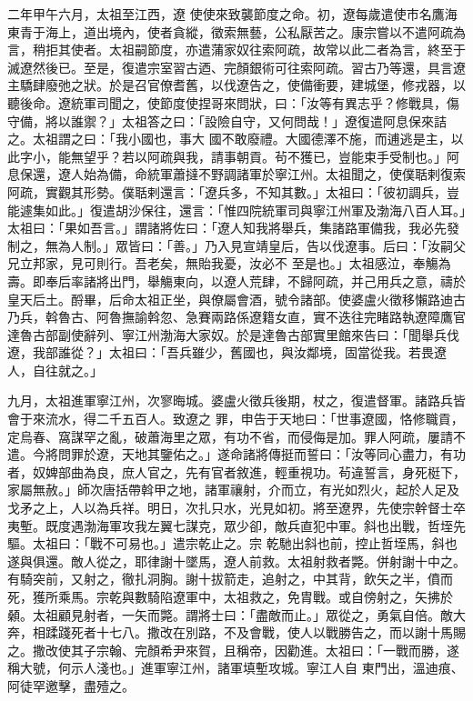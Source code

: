\begin{pinyinscope}
 二年甲午六月，太祖至江西，遼
 使使來致襲節度之命。初，遼每歲遣使市名鷹海東青于海上，道出境內，使者貪縱，徵索無藝，公私厭苦之。康宗嘗以不遣阿疏為言，稍拒其使者。太祖嗣節度，亦遣蒲家奴往索阿疏，故常以此二者為言，終至于滅遼然後已。至是，復遣宗室習古迺、完顏銀術可往索阿疏。習古乃等還，具言遼主驕肆廢弛之狀。於是召官僚耆舊，以伐遼告之，使備衝要，建城堡，修戎器，以聽後命。遼統軍司聞之，使節度使捏哥來問狀，曰：「汝等有異志乎？修戰具，傷守備，將以誰禦？」太祖答之曰：「設險自守，又何問哉！」遼復遣阿息保來詰之。太祖謂之曰：「我小國也，事大
 國不敢廢禮。大國德澤不施，而逋逃是主，以此字小，能無望乎？若以阿疏與我，請事朝貢。茍不獲已，豈能束手受制也。」阿息保還，遼人始為備，命統軍蕭撻不野調諸軍於寧江州。太祖聞之，使僕聒剌復索阿疏，實觀其形勢。僕聒剌還言：「遼兵多，不知其數。」太祖曰：「彼初調兵，豈能遽集如此。」復遣胡沙保往，還言：「惟四院統軍司與寧江州軍及渤海八百人耳。」太祖曰：「果如吾言。」謂諸將佐曰：「遼人知我將舉兵，集諸路軍備我，我必先發制之，無為人制。」眾皆曰：「善。」乃入見宣靖皇后，告以伐遼事。后曰：「汝嗣父兄立邦家，見可則行。吾老矣，無貽我憂，汝必不
 至是也。」太祖感泣，奉觴為壽。即奉后率諸將出門，舉觴東向，以遼人荒肆，不歸阿疏，并己用兵之意，禱於皇天后土。酹畢，后命太祖正坐，與僚屬會酒，號令諸部。使婆盧火徵移懶路迪古乃兵，斡魯古、阿魯撫諭斡忽、急賽兩路係遼籍女直，實不迭往完睹路執遼障鷹官達魯古部副使辭列、寧江州渤海大家奴。於是達魯古部實里館來告曰：「聞舉兵伐遼，我部誰從？」太祖曰：「吾兵雖少，舊國也，與汝鄰境，固當從我。若畏遼人，自往就之。」



 九月，太祖進軍寧江州，次寥晦城。婆盧火徵兵後期，杖之，復遣督軍。諸路兵皆會于來流水，得二千五百人。致遼之
 罪，申告于天地曰：「世事遼國，恪修職貢，定烏春、窩謀罕之亂，破蕭海里之眾，有功不省，而侵侮是加。罪人阿疏，屢請不遣。今將問罪於遼，天地其鑒佑之。」遂命諸將傳挺而誓曰：「汝等同心盡力，有功者，奴婢部曲為良，庶人官之，先有官者敘進，輕重視功。茍違誓言，身死梃下，家屬無赦。」師次唐括帶斡甲之地，諸軍禳射，介而立，有光如烈火，起於人足及戈矛之上，人以為兵祥。明日，次扎只水，光見如初。將至遼界，先使宗幹督士卒夷塹。既度遇渤海軍攻我左翼七謀克，眾少卻，敵兵直犯中軍。斜也出戰，哲垤先驅。太祖曰：「戰不可易也。」遣宗乾止之。宗
 乾馳出斜也前，控止哲垤馬，斜也遂與俱還。敵人從之，耶律謝十墜馬，遼人前救。太祖射救者斃。併射謝十中之。有騎突前，又射之，徹扎洞胸。謝十拔箭走，追射之，中其背，飲矢之半，僨而死，獲所乘馬。宗乾與數騎陷遼軍中，太祖救之，免胄戰。或自傍射之，矢拂於顙。太祖顧見射者，一矢而斃。謂將士曰：「盡敵而止。」眾從之，勇氣自倍。敵大奔，相蹂踐死者十七八。撒改在別路，不及會戰，使人以戰勝告之，而以謝十馬賜之。撒改使其子宗翰、完顏希尹來賀，且稱帝，因勸進。太祖曰：「一戰而勝，遂稱大號，何示人淺也。」進軍寧江州，諸軍填塹攻城。寧江人自
 東門出，溫迪痕、阿徒罕邀擊，盡殪之。




\end{pinyinscope}
